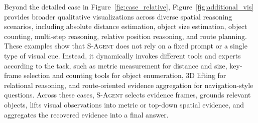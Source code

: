 Beyond the detailed case in Figure~\ref{fig:case_relative}, Figure~\ref{fig:additional_vis} provides broader qualitative visualizations across diverse spatial reasoning scenarios, including absolute distance estimation, object size estimation, object counting, multi-step reasoning, relative position reasoning, and route planning. These examples show that \textsc{S-Agent} does not rely on a fixed prompt or a single type of visual cue. Instead, it dynamically invokes different tools and experts according to the task, such as metric measurement for distance and size, key-frame selection and counting tools for object enumeration, 3D lifting for relational reasoning, and route-oriented evidence aggregation for navigation-style questions. Across these cases, \textsc{S-Agent} selects evidence frames, grounds relevant objects, lifts visual observations into metric or top-down spatial evidence, and aggregates the recovered evidence into a final answer.

